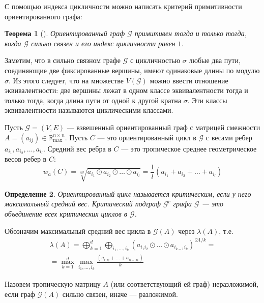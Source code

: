 \documentclass[12pt]{article}
\newtheorem{theorem}{Теорема}[section]
\newtheorem{definition}[theorem]{Определение}
\begin{document}
С помощью индекса цикличности можно написать критерий примитивности ориентированного графа:

\begin{theorem}[\cite{Brualdi}]
Ориентированный граф $\mathcal{G}$ примитивен тогда и только тогда, когда $\mathcal{G}$ сильно связен и его индекс цикличности равен $1$.
\end{theorem}

Заметим, что в сильно связном графе $\mathcal{G}$ с цикличностью $\sigma$ любые два пути, соединяющие две фиксированные вершины, имеют одинаковые длины по модулю $\sigma$. Из этого следует, что на множестве $V(\mathcal{G})$ можно ввести отношение эквивалентности: две вершины лежат в одном классе эквивалентности тогда и только тогда, когда длина пути от одной к другой кратна $\sigma$. Эти классы эквивалентности называются циклическими классами.

Пусть $\mathcal{G} = (V, E)$ --- взвешенный ориентированный граф с матрицей смежности $A = (a_{ij}) \in \mathbb{R}_{\max}^{n \times n}$. Пусть $C$ --- это ориентированный цикл в $\mathcal{G}$ с весами ребер $a_{i_1}, a_{i_2}, \dots, a_{i_l}$. Средний вес ребра в $C$ --- это тропическое среднее геометрическое весов ребер в $C$:
\begin{equation*}
    w_a(C) = \sqrt[\odot l]{a_{i_1} \odot a_{i_2} \odot \dots \odot a_{i_l}}=
    \frac{1}{l}(a_{i_1} + a_{i_2} + \dots + a_{i_l})
\end{equation*}
\begin{definition}
Ориентированный цикл называется критическим, если у него максимальный средний вес. Критический подграф $\mathcal{G}^c$ графа $\mathcal{G}$ --- это объединение всех критических циклов в $\mathcal{G}$.
\end{definition}

Обозначим максимальный средний вес цикла в $\mathcal{G}(A)$ через $\lambda(A)$, т.е.
\begin{equation*}
    \begin{split}
        \lambda(A) = \bigoplus_{k = 1}^d \bigoplus_{i_1, \dots, i_k} (a_{{i_1}{i_2}}\odot \dots \odot a_{{i_{k - 1}}{i_k}})^{\odot{1/k}} =\\
        =\max_{k = 1}^d \max_{i_1, \dots, i_k} \frac{(a_{{i_1}{i_2}} + \dots + a_{{i_{k - 1}}{i_k}})}{k}
    \end{split}
\end{equation*}

Назовем тропическую матрицу $A$ (или соответствующий ей граф) неразложимой, если граф $\mathcal{G}(A)$ сильно связен, иначе --- разложимой.
\end{document}
